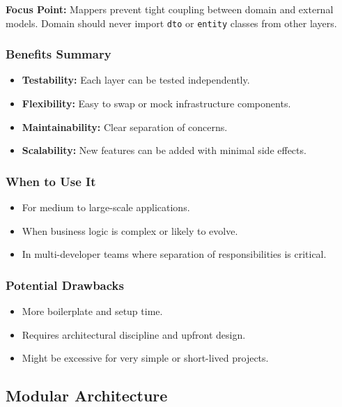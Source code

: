 \documentclass[a4paper,12pt]{article}
\begin{document}
\textbf{Focus Point:} Mappers prevent tight coupling between domain and external models. Domain should never import \texttt{dto} or \texttt{entity} classes from other layers.

\subsubsection{Benefits Summary}

\begin{itemize}
  \item \textbf{Testability:} Each layer can be tested independently.
  \item \textbf{Flexibility:} Easy to swap or mock infrastructure components.
  \item \textbf{Maintainability:} Clear separation of concerns.
  \item \textbf{Scalability:} New features can be added with minimal side effects.
\end{itemize}

\subsubsection{When to Use It}

\begin{itemize}
  \item For medium to large-scale applications.
  \item When business logic is complex or likely to evolve.
  \item In multi-developer teams where separation of responsibilities is critical.
\end{itemize}

\subsubsection{Potential Drawbacks}

\begin{itemize}
  \item More boilerplate and setup time.
  \item Requires architectural discipline and upfront design.
  \item Might be excessive for very simple or short-lived projects.
\end{itemize}

\subsection{Modular Architecture}
\end{document}
